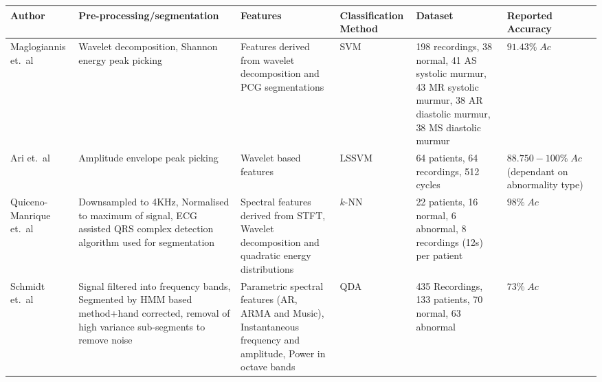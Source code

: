\documentclass[titlepage, 12pt]{scrartcl} \usepackage{enumitem}
\newcommand{\dtoprule}{\specialrule{1pt}{0pt}{1.4pt}%
            \specialrule{1pt}{0pt}{\belowrulesep}%
            }
\begin{document}
\begin{landscape}
\begin{table}[htbp]
    \label{PriorWorkTable}
\scriptsize
{}
\doublespacing
\begin{tabulary}{\linewidth}{LLLLLL}
\dtoprule
Author                   & Pre-processing/segmentation                                                                                                               & Features                                                                                                        & Classification Method & Dataset                                                                                                                 & Reported Accuracy                                  \\ \hline
Maglogiannis et.\ al     & Wavelet decomposition, Shannon energy peak picking                                                                                        & Features derived from wavelet decomposition and PCG segmentations                                               & SVM                   & 198 recordings, 38 normal, 41 AS systolic murmur, 43 MR systolic murmur, 38 AR diastolic murmur, 38 MS diastolic murmur & $91.43\%\;Ac$                                      \\
Ari et.\ al              & Amplitude envelope peak picking~\parencite{Ari2007}                                                                                       & Wavelet based features                                                                                          & LSSVM                 & 64 patients, 64 recordings, 512 cycles                                                                                  & $88.750-100\%\;Ac$ (dependant on abnormality type) \\
Quiceno-Manrique et.\ al & Downsampled to 4KHz, Normalised to maximum of signal, ECG assisted QRS complex detection algorithm used for segmentation                  & Spectral features derived from STFT, Wavelet decomposition and quadratic energy distributions                   & $k$-NN                & 22 patients, 16 normal, 6 abnormal, 8 recordings (12s) per patient                                                      & $98\%\;Ac$                                         \\
Schmidt et.\ al          & Signal filtered into frequency bands, Segmented by HMM based method+hand corrected, removal of high variance sub-segments to remove noise & Parametric spectral features (AR, ARMA and Music), Instantaneous frequency and amplitude, Power in octave bands & QDA                   & 435 Recordings, 133 patients, 70 normal, 63 abnormal                                                                    & $73\%\;Ac$                                         \\

\end{tabulary}
\end{table}
\end{landscape}
\end{document}
